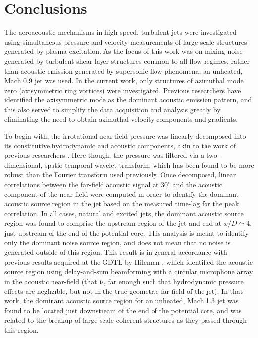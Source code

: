\section{Conclusions}
The aeroacoustic mechanisms in high-speed, turbulent jets were investigated using simultaneous pressure and velocity measurements of large-scale structures generated by plasma excitation.
As the focus of this work was on mixing noise generated by turbulent shear layer structures common to all flow regimes, rather than acoustic emission generated by supersonic flow phenomena, an unheated, Mach 0.9 jet was used.
In the current work, only structures of azimuthal mode zero (axisymmetric ring vortices) were investigated. Previous researchers have identified the axisymmetric mode as the dominant acoustic emission pattern, and this also served to simplify the data acquisition and analysis greatly by eliminating the need to obtain azimuthal velocity components and gradients.

To begin with, the irrotational near-field pressure was linearly decomposed into its constitutive hydrodynamic and acoustic components, akin to the work of previous researchers \citep{Tinney2008}.
Here though, the pressure was filtered via a two-dimensional, spatio-temporal wavelet transform, which has been found to be more robust than the Fourier transform used previously.
Once decomposed, linear correlations between the far-field acoustic signal at $30^\circ$ and the acoustic component of the near-field were computed in order to identify the dominant acoustic source region in the jet based on the measured time-lag for the peak correlation.
In all cases, natural and excited jets, the dominant acoustic source region was found to comprise the upstream region of the jet and end at $x/D \simeq 4$, just upstream of the end of the potential core.
This analysis is meant to identify only the dominant noise source region, and does not mean that no noise is generated outside of this region.
This result is in general accordance with previous results acquired at the GDTL by Hileman \etal \citep{Hileman2005}, which identified the acoustic source region using delay-and-sum beamforming with a circular microphone array in the acoustic near-field (that is, far enough such that hydrodynamic pressure effects are negligible, but not in the true geometric far-field of the jet).
In that work, the dominant acoustic source region for an unheated, Mach 1.3 jet was found to be located just downstream of the end of the potential core, and was related to the breakup of large-scale coherent structures as they passed through this region.

